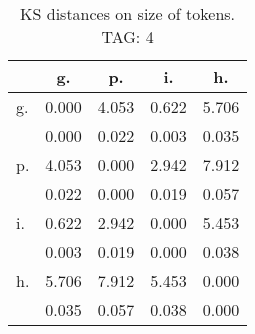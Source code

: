 \begin{table}[h!]
\begin{center}
\begin{tabular}{| l | c | c | c | c |}\hline
 & g. & p. & i. & h. \\\hline
g. & 0.000  & 4.053  & 0.622  & 5.706 \\\hline
 & 0.000  & 0.022  & 0.003  & 0.035 \\\hline
p. & 4.053  & 0.000  & 2.942  & 7.912 \\\hline
 & 0.022  & 0.000  & 0.019  & 0.057 \\\hline
i. & 0.622  & 2.942  & 0.000  & 5.453 \\\hline
 & 0.003  & 0.019  & 0.000  & 0.038 \\\hline
h. & 5.706  & 7.912  & 5.453  & 0.000 \\\hline
 & 0.035  & 0.057  & 0.038  & 0.000 \\\hline
\end{tabular}
\caption{KS distances on size of tokens. TAG: 4}
\end{center}
\end{table}